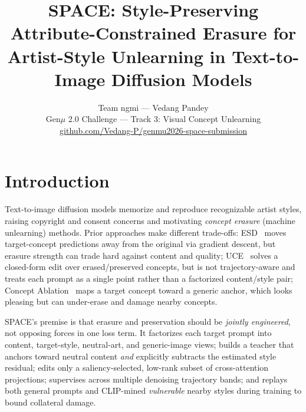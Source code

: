 \documentclass[10pt,twocolumn]{article}
\title{\vspace{-2.6em}\textbf{SPACE: Style-Preserving Attribute-Constrained Erasure for\\ Artist-Style Unlearning in Text-to-Image Diffusion Models}\vspace{-0.8em}}
\author{\normalsize Team ngmi --- Vedang Pandey \\ \small Gen$\mu$ 2.0 Challenge --- Track 3: Visual Concept Unlearning \\ \small \href{https://github.com/Vedang-P/genmu2026-space-submission}{github.com/Vedang-P/genmu2026-space-submission}}
\date{}
\begin{document}

\section{Introduction}
Text-to-image diffusion models memorize and reproduce recognizable artist styles, raising copyright and consent concerns and motivating \emph{concept erasure} (machine unlearning) methods. Prior approaches make different trade-offs: ESD~\cite{esd} moves target-concept predictions away from the original via gradient descent, but erasure strength can trade hard against content and quality; UCE~\cite{uce} solves a closed-form edit over erased/preserved concepts, but is not trajectory-aware and treats each prompt as a single point rather than a factorized content/style pair; Concept Ablation~\cite{conceptablation} maps a target concept toward a generic anchor, which looks pleasing but can under-erase and damage nearby concepts.

SPACE's premise is that erasure and preservation should be \emph{jointly engineered}, not opposing forces in one loss term. It factorizes each target prompt into content, target-style, neutral-art, and generic-image views; builds a teacher that anchors toward neutral content \emph{and} explicitly subtracts the estimated style residual; edits only a saliency-selected, low-rank subset of cross-attention projections; supervises across multiple denoising trajectory bands; and replays both general prompts and CLIP-mined \emph{vulnerable} nearby styles during training to bound collateral damage.
\end{document}
